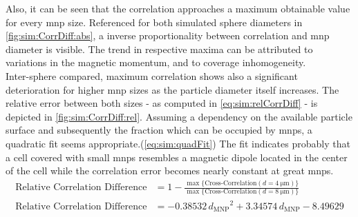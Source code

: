 Also, it can be seen that the correlation approaches a maximum obtainable value for every \gls{mnp} size. Referenced for both simulated sphere diameters in \cref{fig:sim:CorrDiff:abs}, a inverse proportionality between correlation and \gls{mnp} diameter is visible. The trend in respective maxima can be attributed to variations in the magnetic momentum, and to coverage inhomogeneity. \\ 
Inter-sphere compared, maximum correlation shows also a significant deterioration for higher \gls{mnp} sizes as the particle diameter itself increases. The relative error between both sizes - as computed in \cref{eq:sim:relCorrDiff} -  is depicted in \cref{fig:sim:CorrDiff:rel}. Assuming a dependency on the available particle surface and subsequently the fraction which can be occupied by \glspl{mnp}, a quadratic fit seems appropriate.(\cref{eq:sim:quadFit}) The fit indicates probably that a cell covered with small \glspl{mnp} resembles a magnetic dipole located in the center of the cell while the correlation error becomes nearly constant at great \glspl{mnp}.
\begin{align}
	\text{Relative\ Correlation\ Difference} &= 1- \frac{\max\{\text{Cross-Correlation}(d=\SI{4}{\micro\meter})\}}{\max\{\text{Cross-Correlation}(d = \SI{8}{\micro\meter})\}} \label{eq:sim:relCorrDiff}\\
	\text{Relative\ Correlation\ Difference} &= \num{-0,38532} \, {d_\text{MNP}}^2 + \num{3,34574} \, d_\text{MNP} - \num{8,49629} \label{eq:sim:quadFit}
\end{align}
